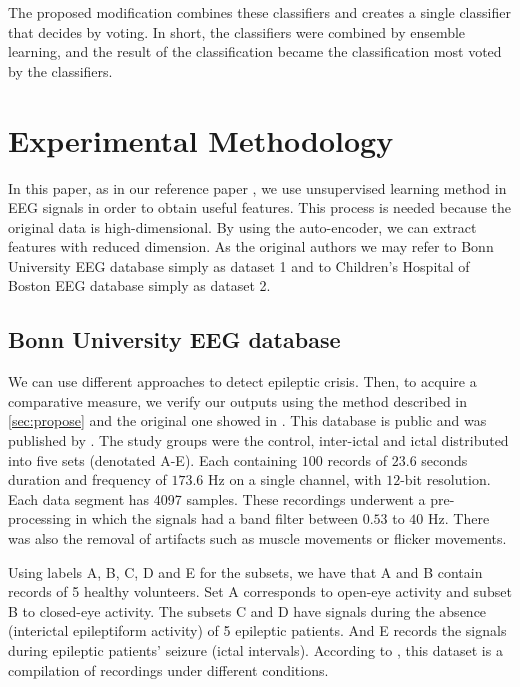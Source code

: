 The proposed modification combines these classifiers and creates a single classifier that decides by voting. In short, the classifiers were combined by ensemble learning, and the result of the classification became the classification most voted by the classifiers.


















\section{Experimental Methodology}
\label{sec:metho}
In this paper, as in our reference paper \cite{WenZha:2018}, we use unsupervised learning method in EEG signals in order to obtain useful features. This process is needed because the original data is high-dimensional. By using the auto-encoder, we can extract features with reduced dimension. As the original authors we may refer to Bonn University EEG database simply as dataset 1 and to Children's Hospital of Boston EEG database simply as dataset 2.

\subsection{Bonn University EEG database}

We can use different approaches to detect epileptic crisis. Then, to acquire a comparative measure, we verify our outputs using the method described in \ref{sec:propose} and the original one showed in \cite{WenZha:2018}. This database is public and was published by \cite{andrzejak}. The study groups were the control, inter-ictal and ictal distributed into five sets (denotated A-E). Each containing $100$ records of $23.6$ seconds duration and frequency of $173.6$ Hz on a single channel, with $12$-bit resolution. Each data segment has 4097 samples. These recordings underwent a pre-processing in which the signals had a band filter between $0.53$ to $40$ Hz. There was also the removal of artifacts such as muscle movements or flicker movements.

Using labels A, B, C, D and E for the subsets, we have that A and B contain records of 5 healthy volunteers. Set A corresponds to open-eye activity and subset B to closed-eye activity. The subsets C and D have signals during the absence (interictal epileptiform activity) of 5 epileptic patients. And E records the signals during epileptic patients' seizure (ictal intervals). According to \cite{kamath2015analysis}, this dataset is a compilation of recordings under different conditions.

